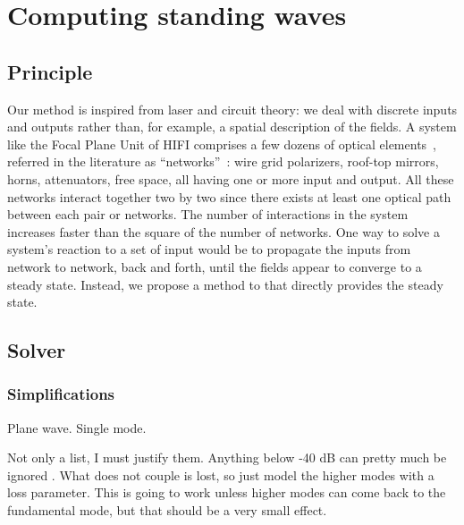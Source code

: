 \cleardoublepage
\chapter{Computing standing waves}
\label{sec:chapter2}
\section{Principle}
Our method is inspired from laser and circuit theory: we deal with discrete inputs and outputs rather than, for example, a spatial description of the fields.
A system like the Focal Plane Unit of HIFI comprises a few dozens of optical elements~\cite{jackson2002hifi}, referred in the literature as ``networks''~\cite{siegman1986lasers}: wire grid polarizers, roof-top mirrors, horns, attenuators, free space, all having one or more input and output.
All these networks interact together two by two since there exists at least one optical path between each pair or networks.
The number of interactions in the system increases faster than the square of the number of networks.
One way to solve a system's reaction to a set of input would be to propagate the inputs from network to network, back and forth, until the fields appear to converge to a steady state.
Instead, we propose a method to that directly provides the steady state.

\section{Solver}

\subsection{Simplifications}

Plane wave.
Single mode.

Not only a list, I must justify them.
Anything below -40 dB can pretty much be ignored .
What does not couple is lost, so just model the higher modes with a loss parameter.
This is going to work unless higher modes can come back to the fundamental mode, but that should be a very small effect.



